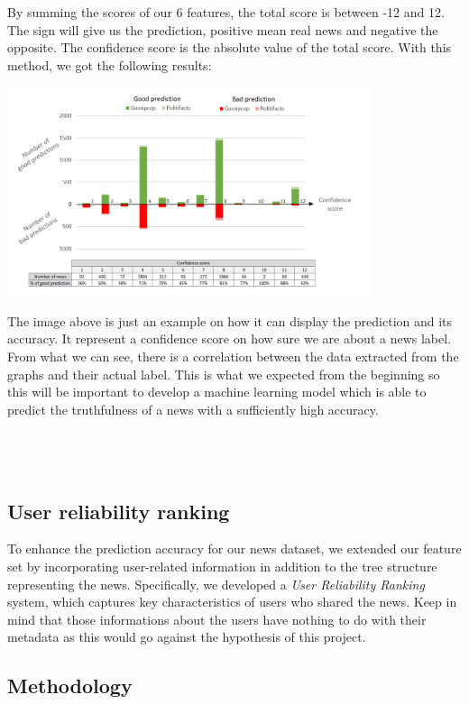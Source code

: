 \documentclass[11pt,a4paper]{article}
\begin{document}
By summing the scores of our 6 features, the total score is between -12 and 12. The sign will give
us the prediction, positive mean real news and negative the opposite. The confidence score is
the absolute value of the total score. With this method, we got the following results:

\begin{center}
    \includegraphics[width=0.8\textwidth]{predictor_results}
\end{center}

The image above is just an example on how it can display the prediction and its accuracy. It
represent a confidence score on how sure we are about a news label. From what we can see,
there is a correlation between the data extracted from the graphs and their actual label. This is
what we expected from the beginning so this will be important to develop a machine learning
model which is able to predict the truthfulness of a news with a sufficiently high accuracy.

\subsection*{\\ \\User reliability ranking}
To enhance the prediction accuracy for our news dataset, we extended our feature set by incorporating user-related information in addition to the tree structure representing the news. Specifically, we developed a \textit{User Reliability Ranking} system, which captures key characteristics of users who shared the news. Keep in mind that those informations about the users have nothing to do with their metadata as this would go against the hypothesis of this project.

\subsection*{Methodology}
\end{document}
